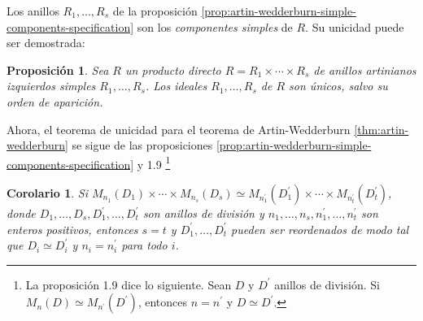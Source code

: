 \documentclass{article}
\newtheorem{corollary}{Corolario}[section]
\newtheorem{proposition}{Proposición}[section]
\begin{document}
Los anillos $R_1, \dots, R_s$ de la proposición \ref{prop:artin-wedderburn-simple-components-specification} son los \emph{componentes simples} de $R$.
Su unicidad puede ser demostrada:

\begin{proposition}\label{thm:artin-wedderburn-components-uniqueness-thm}
    Sea $R$ un producto directo $R = R_1 \times \cdots \times R_s$ de anillos artinianos izquierdos simples $R_1, \dots, R_s$.
    Los ideales $R_1, \dots, R_s$ de $R$ son únicos, salvo su orden de aparición.
\end{proposition}

Ahora, el teorema de unicidad para el teorema de Artin-Wedderburn \ref{thm:artin-wedderburn} se sigue de las proposiciones \ref{prop:artin-wedderburn-simple-components-specification} y 1.9
\footnote{
    La proposición 1.9 dice lo siguiente.
    Sean $D$ y $D^\prime$ anillos de división. Si $M_n(D) \simeq M_{n^\prime}(D^\prime)$, entonces $n = n^\prime$ y $D \simeq D^\prime$.
}

\begin{corollary}
    Si $M_{n_1}(D_1) \times \cdots \times M_{n_s}(D_s) \simeq M_{n^\prime_1}(D^\prime_1) \times \cdots \times M_{n^\prime_t}(D^\prime_t)$, donde $D_1, \dots, D_s, D^\prime_1, \dots, D^\prime_t$ son anillos de división y $n_1, \dots, n_s, n^\prime_1, \dots, n^\prime_t$ son enteros positivos, entonces $s = t$ y $D^\prime_1, \dots, D^\prime_t$ pueden ser reordenados de modo tal que $D_i \simeq D^\prime_i$ y $n_i = n^\prime_i$ para todo $i$.
\end{corollary}
\end{document}
